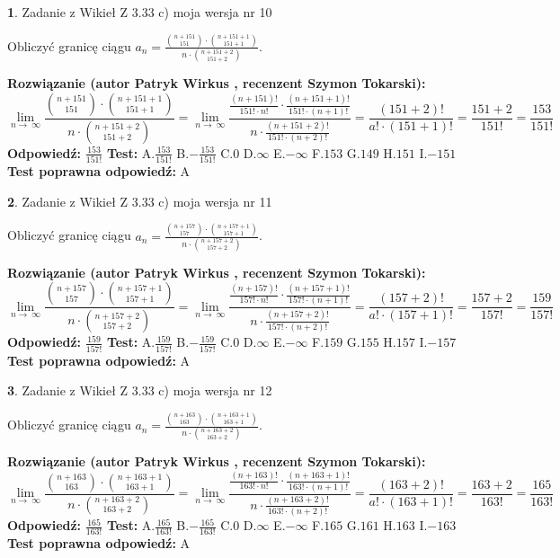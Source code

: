 \documentclass[12pt, a4paper]{article}
\theoremstyle{definition} %
\newtheorem{zad}{}
\newcommand{\zadStart}[1]{\begin{zad}#1\newline}
\newcommand{\zadStop}{\end{zad}}
\newcommand{\rozwStart}[2]{\noindent \textbf{Rozwiązanie (autor #1 , recenzent #2): }\newline}
\newcommand{\rozwStop}{\newline}
\newcommand{\odpStart}{\noindent \textbf{Odpowiedź:}\newline}
\newcommand{\odpStop}{\newline}
\newcommand{\testStart}{\noindent \textbf{Test:}\newline}
\newcommand{\testStop}{\newline}
\newcommand{\kluczStart}{\noindent \textbf{Test poprawna odpowiedź:}\newline}
\newcommand{\kluczStop}{\newline}
\begin{document}
\zadStart{Zadanie z Wikieł Z 3.33 c) moja wersja nr 10}

Obliczyć granicę ciągu $a_{n}=\frac{{n+151\choose151}\cdot{n+151+1\choose151+1}}{n\cdot{n+151+2\choose151+2}}$.
\zadStop
\rozwStart{Patryk Wirkus}{Szymon Tokarski}
$$\lim\limits_{n\to\ \infty}\frac{{n+151\choose151}\cdot{n+151+1\choose151+1}}{n\cdot{n+151+2\choose151+2}} = \lim\limits_{n\to\ \infty}\frac{\frac{(n+151)!}{151! \cdot n!}\cdot \frac{(n+151+1)!}{151! \cdot (n+1)!}}{n\cdot \frac{(n+151+2)!}{151! \cdot (n+2)!}} = \frac{(151+2)!}{a!\cdot (151+1)!} = \frac{151+2}{151!} = \frac{153}{151!}$$
\rozwStop
\odpStart
$\frac{153}{151!}$
\odpStop
\testStart
A.$\frac{153}{151!}$ B.$-\frac{153}{151!}$ C.$0$ D.$\infty$ E.$-\infty$
F.$153$ G.$149$
H.$151$
I.$-151$
\testStop
\kluczStart
A
\kluczStop



\zadStart{Zadanie z Wikieł Z 3.33 c) moja wersja nr 11}

Obliczyć granicę ciągu $a_{n}=\frac{{n+157\choose157}\cdot{n+157+1\choose157+1}}{n\cdot{n+157+2\choose157+2}}$.
\zadStop
\rozwStart{Patryk Wirkus}{Szymon Tokarski}
$$\lim\limits_{n\to\ \infty}\frac{{n+157\choose157}\cdot{n+157+1\choose157+1}}{n\cdot{n+157+2\choose157+2}} = \lim\limits_{n\to\ \infty}\frac{\frac{(n+157)!}{157! \cdot n!}\cdot \frac{(n+157+1)!}{157! \cdot (n+1)!}}{n\cdot \frac{(n+157+2)!}{157! \cdot (n+2)!}} = \frac{(157+2)!}{a!\cdot (157+1)!} = \frac{157+2}{157!} = \frac{159}{157!}$$
\rozwStop
\odpStart
$\frac{159}{157!}$
\odpStop
\testStart
A.$\frac{159}{157!}$ B.$-\frac{159}{157!}$ C.$0$ D.$\infty$ E.$-\infty$
F.$159$ G.$155$
H.$157$
I.$-157$
\testStop
\kluczStart
A
\kluczStop



\zadStart{Zadanie z Wikieł Z 3.33 c) moja wersja nr 12}

Obliczyć granicę ciągu $a_{n}=\frac{{n+163\choose163}\cdot{n+163+1\choose163+1}}{n\cdot{n+163+2\choose163+2}}$.
\zadStop
\rozwStart{Patryk Wirkus}{Szymon Tokarski}
$$\lim\limits_{n\to\ \infty}\frac{{n+163\choose163}\cdot{n+163+1\choose163+1}}{n\cdot{n+163+2\choose163+2}} = \lim\limits_{n\to\ \infty}\frac{\frac{(n+163)!}{163! \cdot n!}\cdot \frac{(n+163+1)!}{163! \cdot (n+1)!}}{n\cdot \frac{(n+163+2)!}{163! \cdot (n+2)!}} = \frac{(163+2)!}{a!\cdot (163+1)!} = \frac{163+2}{163!} = \frac{165}{163!}$$
\rozwStop
\odpStart
$\frac{165}{163!}$
\odpStop
\testStart
A.$\frac{165}{163!}$ B.$-\frac{165}{163!}$ C.$0$ D.$\infty$ E.$-\infty$
F.$165$ G.$161$
H.$163$
I.$-163$
\testStop
\kluczStart
A
\kluczStop
\end{document}
